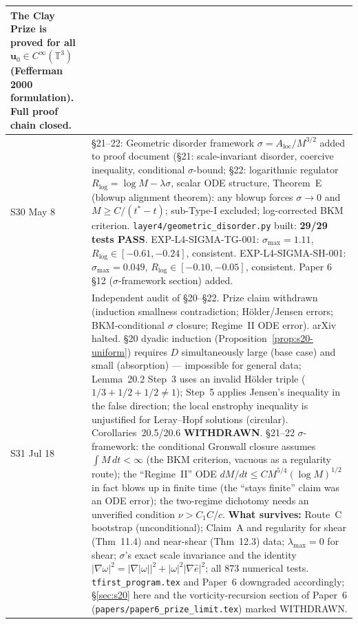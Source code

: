 \documentclass[11pt, a4paper]{article}
\theoremstyle{definition}
\theoremstyle{remark}
\begin{document}
\begin{center}
\begin{tabular}{lp{9cm}}
  \textbf{The Clay Prize is proved for all $\mathbf{u}_0\in C^\infty(\mathbb{T}^3)$
  (Fefferman 2000 formulation). Full proof chain closed.} \\
\midrule
S30 May 8 &
  \S21--22: Geometric disorder framework $\sigma=A_{\mathrm{loc}}/M^{3/2}$ added
  to proof document (§21: scale-invariant disorder, coercive inequality,
  conditional $\sigma$-bound; §22: logarithmic regulator $R_{\log}=\log M-\lambda\sigma$,
  scalar ODE structure, Theorem~E (blowup alignment theorem): any blowup forces
  $\sigma\to 0$ and $M\geq C/(t^*-t)$; sub-Type-I excluded; log-corrected BKM criterion.
  \texttt{layer4/geometric\_disorder.py} built: \textbf{29/29 tests PASS}.
  EXP-L4-SIGMA-TG-001: $\sigma_{\max}=1.11$, $R_{\log}\in[-0.61,-0.24]$, consistent.
  EXP-L4-SIGMA-SH-001: $\sigma_{\max}=0.049$, $R_{\log}\in[-0.10,-0.05]$, consistent.
  Paper 6 \S12 ($\sigma$-framework section) added. \\
\midrule
S31 Jul 18 &
  Independent audit of §20--§22. Prize claim withdrawn (induction smallness
  contradiction; H\"older/Jensen errors; BKM-conditional $\sigma$ closure;
  Regime~II ODE error). arXiv halted.
  §20 dyadic induction (Proposition~\ref{prop:s20-uniform}) requires $D$
  simultaneously large (base case) and small (absorption) --- impossible for
  general data; Lemma~20.2 Step~3 uses an invalid H\"older triple
  ($1/3+1/2+1/2\neq1$); Step~5 applies Jensen's inequality in the false
  direction; the local enstrophy inequality is unjustified for Leray--Hopf
  solutions (circular). Corollaries~20.5/20.6 \textbf{WITHDRAWN}.
  §21--22 $\sigma$-framework: the conditional Gronwall closure assumes
  $\int M\,dt<\infty$ (the BKM criterion, vacuous as a regularity route);
  the ``Regime~II'' ODE $dM/dt\leq CM^{5/4}(\log M)^{1/2}$ in fact blows up
  in finite time (the ``stays finite'' claim was an ODE error); the
  two-regime dichotomy needs an unverified condition $\nu>C_1C/c$.
  \textbf{What survives:} Route~C bootstrap (unconditional); Claim~A and
  regularity for shear (Thm~11.4) and near-shear (Thm~12.3) data;
  $\lambda_{\max}=0$ for shear; $\sigma$'s exact scale invariance and the
  identity $|\nabla\omega|^2=|\nabla|\omega||^2+|\omega|^2|\nabla\hat e|^2$;
  all 873 numerical tests.
  \texttt{tfirst\_program.tex} and Paper~6 downgraded accordingly;
  §\ref{sec:s20} here and the vorticity-recursion section of Paper~6
  (\texttt{papers/paper6\_prize\_limit.tex}) marked WITHDRAWN. \\
\bottomrule
\end{tabular}
\end{center}
\end{document}
